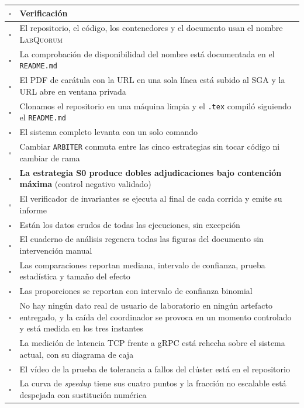 \documentclass[11pt,a4paper]{article}
\begin{document}
	\begin{center}
		\small
		\begin{longtable}{@{}p{0.7cm}p{14.2cm}@{}}
			\toprule
			\textbf{$\square$} & \textbf{Verificación} \\
			\midrule
			\endhead
			$\square$ & El repositorio, el código, los contenedores y el documento usan el nombre \textsc{LabQuorum} \\
			$\square$ & La comprobación de disponibilidad del nombre está documentada en el \texttt{README.md} \\
			$\square$ & El PDF de carátula con la URL en una sola línea está subido al SGA y la URL abre en ventana privada \\
			$\square$ & Clonamos el repositorio en una máquina limpia y el \texttt{.tex} compiló siguiendo el \texttt{README.md} \\
			$\square$ & El sistema completo levanta con un solo comando \\
			$\square$ & Cambiar \texttt{ARBITER} conmuta entre las cinco estrategias sin tocar código ni cambiar de rama \\
			$\square$ & \textbf{La estrategia S0 produce dobles adjudicaciones bajo contención máxima} (control negativo validado) \\
			$\square$ & El verificador de invariantes se ejecuta al final de cada corrida y emite su informe \\
			$\square$ & Están los datos crudos de todas las ejecuciones, sin excepción \\
			$\square$ & El cuaderno de análisis regenera todas las figuras del documento sin intervención manual \\
			$\square$ & Las comparaciones reportan mediana, intervalo de confianza, prueba estadística y tamaño del efecto \\
			$\square$ & Las proporciones se reportan con intervalo de confianza binomial \\
			$\square$ & No hay ningún dato real de usuario de laboratorio en ningún artefacto entregado, y la caída del coordinador se provoca en un momento controlado y está medida en los tres instantes \\
			$\square$ & La medición de latencia TCP frente a gRPC está rehecha sobre el sistema actual, con su diagrama de caja \\
			$\square$ & El vídeo de la prueba de tolerancia a fallos del clúster está en el repositorio \\
			$\square$ & La curva de \emph{speedup} tiene sus cuatro puntos y la fracción no escalable está despejada con sustitución numérica \\

\end{longtable}
\end{center}
\end{document}
